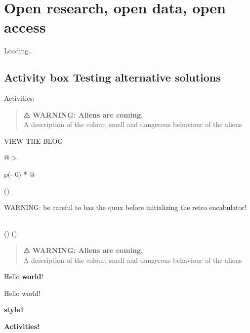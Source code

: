 \documentclass[
]{book}
\begin{document}
\hypertarget{open-research-open-data-open-access}{%
\chapter{Open research, open data, open access}\label{open-research-open-data-open-access}}

Loading\ldots{}

\hypertarget{activity-box-testing-alternative-solutions}{%
\section{Activity box Testing alternative solutions}\label{activity-box-testing-alternative-solutions}}

Activities:

\begin{quote}
\textbf{⚠ WARNING: Aliens are coming.}\\
A description of the colour, smell and dangerous behaviour of the aliens
\end{quote}

VIEW THE BLOG

\begin{longtable}[]{@{}
  >{\raggedright\arraybackslash}p{(\columnwidth - 0\tabcolsep) * }@{}}
\toprule()
\begin{minipage}[b]{\linewidth}\raggedright
WARNING: be careful to baz the quux before initializing the retro encabulator!
\end{minipage} \\
\midrule()
\endhead
\bottomrule()
\end{longtable}

\begin{quote}
\textbf{⚠ WARNING: Aliens are coming.}\\
A description of the colour, smell and dangerous behaviour of the aliens
\end{quote}

\leavevmode{}%
Hello \textbf{world}!

\leavevmode{}%
Hello world!

\textbf{style1}

\textbf{Activities!}
\end{document}
